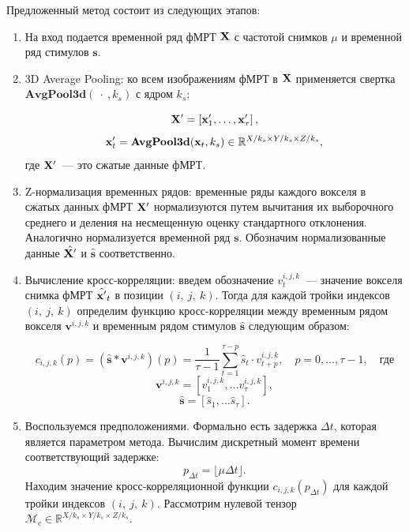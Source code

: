 Предложенный метод состоит из следующих этапов:
\begin{enumerate}
    \item На вход подается временной ряд фМРТ $\mathbf{X}$ с частотой снимков $\mu$ и временной ряд стимулов $\bm{s}$.
    \item 3D Average Pooling: ко всем изображениям фМРТ в $\mathbf{X}$ применяется свертка $\textbf{AvgPool3d}(~\cdot~,  k_s)$ с ядром $k_s$:

    \begin{equation*}
    \mathbf{X}' = \left[\mathbf{x}'_1, \dots, \mathbf{x}'_{\tau}\right],
    \end{equation*}
    \begin{equation*}
    \mathbf{x}'_t = \textbf{AvgPool3d}(\mathbf{x}_t, k_s) \in \mathbb{R}^{X/ k_s \times Y/ k_s \times Z/ k_s}, 
    \end{equation*}
    где $\mathbf{X}'$~--- это сжатые данные фМРТ.
    \item Z-нормализация временных рядов: временные ряды каждого вокселя в сжатых данных фМРТ $\mathbf{X}'$ нормализуются путем вычитания их выборочного среднего и деления на несмещенную оценку стандартного отклонения. 
	Аналогично нормализуется временной ряд $\bm{s}$. 
	Обозначим нормализованные данные $\hat{\mathbf{\mathbf{X}'}}$ и $\hat{\bm{\bm{s}}}$ соответственно. 


    \item Вычисление кросс-корреляции: введем обозначение $v^{i,j,k}_t$~--- значение вокселя снимка фМРТ $\hat{\mathbf{\mathbf{x}'}}_t$ в позиции $(i,~j,~k)$. Тогда для каждой тройки индексов $(i,~j,~k)$ определим функцию кросс-корреляции между временным рядом вокселя $\bm{v}^{i,j,k}$ и временным рядом стимулов $\hat{\bm{\bm{s}}}$ следующим образом:
    
    \begin{equation*}
        c_{i,j,k}\left(p\right) = \left(\hat{\bm{\bm{s}}} * \bm{v}^{i,j,k}\right)\left(p\right)=\dfrac{1}{\tau-1}\sum_{t=1}^{\tau-p} \hat{s}_{t} \cdot v^{i,j,k}_{t+p}, \quad p = 0, \ldots, \tau-1,\quad \text{где}
    \end{equation*}
        $$\bm{v}^{i,j,k}=\left[v^{i,j,k}_1, \dots v^{i,j,k}_{\tau}\right],$$
        $$\hat{\bm{\bm{s}}} = \left[\hat{s}_1, \dots \hat{s}_{\tau}\right].$$ 


    \item Воспользуемся предположениями.
    Формально есть задержка $\Delta t$, которая является параметром метода. Вычислим дискретный момент времени соответствующий задержке:
    $$p_{\Delta t} = \lfloor\mu\Delta t \rfloor.$$
    Находим значение кросс-корреляционной функции $c_{i,j,k}(p_{\Delta t})$ для каждой тройки индексов $(i,~j,~k)$. 
	Рассмотрим нулевой тензор $\mathcal{M}_c \in \mathbb{R}^{X/ k_s \times Y/ k_s \times Z/ k_s}$.
 

\end{enumerate}
